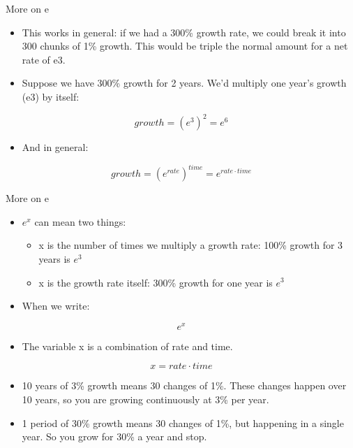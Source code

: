 \documentclass[
  ignorenonframetext,
]{beamer}
\providecommand{\tightlist}{%
  \setlength{\itemsep}{0pt}\setlength{\parskip}{0pt}}
\begin{document}
\begin{frame}{More on e}
\protect\hypertarget{more-on-e-7}{}

\begin{itemize}
\item
  This works in general: if we had a 300\% growth rate, we could break
  it into 300 chunks of 1\% growth. This would be triple the normal
  amount for a net rate of e3.
\item
  Suppose we have 300\% growth for 2 years. We'd multiply one year's
  growth (e3) by itself:
\end{itemize}

\[\displaystyle{growth = \left(e^{3}\right)^{2} = e^{6}}\]

\begin{itemize}
\tightlist
\item
  And in general:
\end{itemize}

\[\displaystyle{growth = \left(e^{rate}\right)^{time} = e^{rate \cdot time}}\]

\end{frame}

\begin{frame}{More on e}
\protect\hypertarget{more-on-e-8}{}

\begin{itemize}
\item
  \(e^{x}\) can mean two things:

  \begin{itemize}
  \item
    x is the number of times we multiply a growth rate: 100\% growth for
    3 years is \(e^{3}\)
  \item
    x is the growth rate itself: 300\% growth for one year is \(e^{3}\)
  \end{itemize}
\item
  When we write:
\end{itemize}

\[\displaystyle{e^x}\]

\begin{itemize}
\tightlist
\item
  The variable x is a combination of rate and time.
\end{itemize}

\[\displaystyle{x = rate \cdot time}\]

\begin{itemize}
\item
  10 years of 3\% growth means 30 changes of 1\%. These changes happen
  over 10 years, so you are growing continuously at 3\% per year.
\item
  1 period of 30\% growth means 30 changes of 1\%, but happening in a
  single year. So you grow for 30\% a year and stop.
\end{itemize}

\end{frame}
\end{document}
